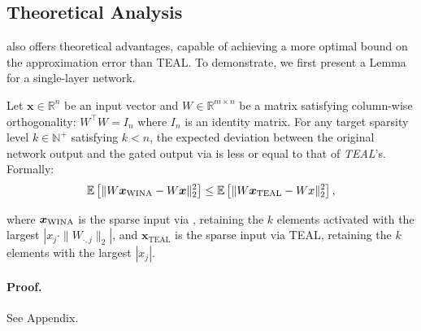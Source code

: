 \subsection{Theoretical Analysis}

{
	\algacro{} also offers theoretical advantages, capable of achieving a more optimal bound on the approximation error than TEAL. To demonstrate, we first present a Lemma for a single-layer network. 
	\begin{lemma}\label{lemma.single_layer}
			Let  $\bm{x} \in \mathbb{R}^n$ be an input vector and $W \in \mathbb{R}^{m \times n}$ be a matrix satisfying column-wise orthogonality: $W^\top W= I_{n}$ where $I_n$ is an identity matrix. For any target sparsity level $k \in \mathbb{N}^+$ satisfying $k < n$, the expected deviation
			between the original network output and the gated output via \textit{\algacro{}} is less or equal to that of \textit{TEAL}'s. Formally:  
			$$\mathbb{E}\left[ \| W\bm{x}_\text{\algacro{}} - W\bm{x} \|_2^2 \right] \le \mathbb{E}\left[ \| W\bm{x}_\text{TEAL} - Wx \|_2^2 \right],$$ 
			
			where $\bm{x}_\text{\algacro{}}$ is the sparse input via \algacro{}, retaining the $k$ elements activated with the largest $|x_j \cdot \|W_{\cdot,j}\|_2 |$, and $\bm{x}_\text{TEAL}$ is the sparse input via TEAL, retaining the $k$ elements with the largest $|x_j|$.
		
		\paragraph{Proof.} See Appendix.
		
	\end{lemma}
	
}
